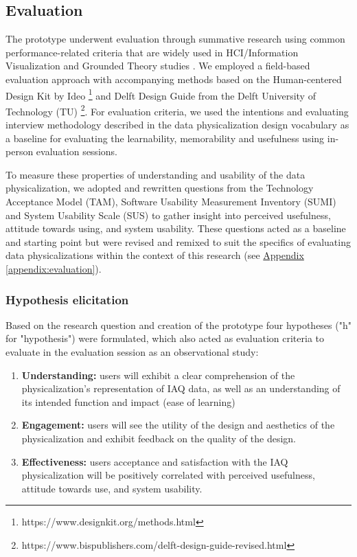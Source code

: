 \subsection{Evaluation}
\label{sec:evaluation}

The prototype underwent evaluation through summative research using common performance-related criteria that are widely used in HCI/Information Visualization \cite{ranasinghe_encoding_2023} and Grounded Theory studies \cite{chun_tie_grounded_2019}. We employed a field-based evaluation approach with accompanying methods based on the Human-centered Design Kit by Ideo \footnote{https://www.designkit.org/methods.html} and Delft Design Guide from the Delft University of Technology (TU) \footnote{https://www.bispublishers.com/delft-design-guide-revised.html}. For evaluation criteria, we used the intentions and evaluating interview methodology described in the data physicalization design vocabulary \cite{jansen_evaluating_2013,ranasinghe_encoding_2023} as a baseline for evaluating the learnability, memorability and usefulness using in-person evaluation sessions. 

To measure these properties of understanding and usability of the data physicalization, we adopted and rewritten questions from the Technology Acceptance Model (TAM), Software Usability Measurement Inventory (SUMI) and System Usability Scale (SUS) to gather insight into perceived usefulness, attitude towards using, and system usability\cite{davis_perceived_1989, brooke_sus_1996}. These questions acted as a baseline and starting point but were revised and remixed to suit the specifics of evaluating data physicalizations within the context of this research (see \hyperref[appendix:evaluation]{Appendix \ref*{appendix:evaluation}}).

\subsubsection{Hypothesis elicitation}

Based on the research question and creation of the prototype four hypotheses ("h" for "hypothesis") were formulated, which also acted as evaluation criteria to evaluate in the evaluation session as an observational study:

\begin{enumerate}
    \renewcommand{\labelenumi}{H\arabic{enumi}:}
    \item \textbf{Understanding:} users will exhibit a clear comprehension of the physicalization's representation of IAQ data, as well as an understanding of its intended function and impact (ease of learning)
    \item \textbf{Engagement:} users will see the utility of the design and aesthetics of the physicalization and exhibit feedback on the quality of the design.
    \item \textbf{Effectiveness:} users acceptance and satisfaction with the IAQ physicalization will be positively correlated with perceived usefulness, attitude towards use, and system usability.
\end{enumerate}

